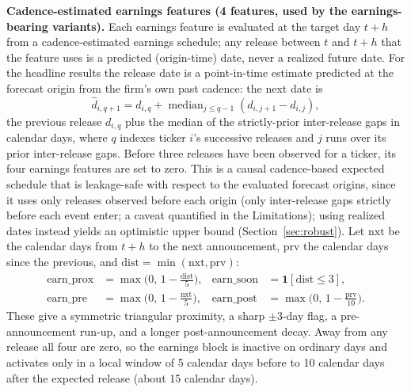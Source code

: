 \documentclass[runningheads,a4paper]{llncs}
\begin{document}
\textbf{Cadence-estimated earnings features (4 features, used by the earnings-bearing variants).} Each earnings feature is evaluated
at the target day $t+h$ from a cadence-estimated earnings schedule; any release between $t$ and $t+h$ that
the feature uses is a predicted (origin-time) date, never a realized future date. For the headline results
the release date is a point-in-time estimate predicted at the forecast origin from the firm's own past
cadence: the next date is
\[ \hat d_{i,q+1} = d_{i,q} + \operatorname{median}_{j\le q-1}\left(d_{i,j+1}-d_{i,j}\right), \]
the previous release $d_{i,q}$ plus the median of the strictly-prior inter-release gaps in calendar days,
where $q$ indexes ticker $i$'s successive releases and $j$ runs over its prior inter-release gaps.
Before three releases have been observed for a ticker, its four earnings features are set to zero. This is a
causal cadence-based expected schedule that is leakage-safe with respect to the evaluated forecast origins,
since it uses only releases observed before each origin (only inter-release gaps strictly before each event
enter; a caveat quantified in the Limitations); using realized dates instead yields an optimistic upper bound
(Section~\ref{sec:robust}). Let $\mathrm{nxt}$ be the calendar days from $t+h$ to
the next announcement, $\mathrm{prv}$ the calendar days since the previous, and
$\mathrm{dist}=\min(\mathrm{nxt},\mathrm{prv})$:
\begin{align}
\mathrm{earn\_prox} &= \max\!\Big(0,\,1-\tfrac{\mathrm{dist}}{5}\Big), &
\mathrm{earn\_soon} &= \mathbf{1}[\mathrm{dist}\le 3],\\
\mathrm{earn\_pre} &= \max\!\Big(0,\,1-\tfrac{\mathrm{nxt}}{5}\Big), &
\mathrm{earn\_post} &= \max\!\Big(0,\,1-\tfrac{\mathrm{prv}}{10}\Big).
\end{align}
These give a symmetric triangular proximity, a sharp $\pm 3$-day flag, a pre-announcement run-up, and a
longer post-announcement decay. Away from any release all four are zero, so the earnings block is inactive on ordinary
days and activates only in a local window of 5 calendar days before to 10 calendar days after the expected
release (about 15 calendar days).
\end{document}
